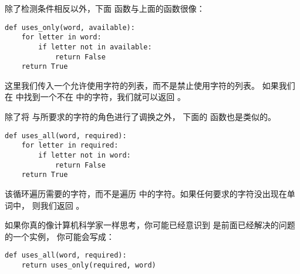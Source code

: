 除了检测条件相反以外，下面  函数与上面的函数很像：

\begin{lstlisting}
def uses_only(word, available):
    for letter in word:
        if letter not in available:
            return False
    return True
\end{lstlisting}


这里我们传入一个允许使用字符的列表，而不是禁止使用字符的列表。
如果我们在  中找到一个不在  中的字符，我们就可以返回  。


除了将  与所要求的字符的角色进行了调换之外，
下面的  函数也是类似的。

\begin{lstlisting}
def uses_all(word, required):
    for letter in required:
        if letter not in word:
            return False
    return True
\end{lstlisting}


该循环遍历需要的字符，而不是遍历  中的字符。如果任何要求的字符没出现在单词中， 则我们返回  。



如果你真的像计算机科学家一样思考，你可能已经意识到  是前面已经解决的问题的一个实例， 你可能会写成：

\begin{lstlisting}
def uses_all(word, required):
    return uses_only(required, word)
\end{lstlisting}


